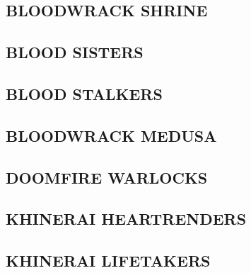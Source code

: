 \hypertarget{bloodwrack-shrine}{%
\subsection{BLOODWRACK SHRINE}\label{bloodwrack-shrine}}

\hypertarget{blood-sisters}{%
\subsection{BLOOD SISTERS}\label{blood-sisters}}

\hypertarget{blood-stalkers}{%
\subsection{BLOOD STALKERS}\label{blood-stalkers}}

\hypertarget{bloodwrack-medusa}{%
\subsection{BLOODWRACK MEDUSA}\label{bloodwrack-medusa}}

\hypertarget{doomfire-warlocks}{%
\subsection{DOOMFIRE WARLOCKS}\label{doomfire-warlocks}}

\hypertarget{khinerai-heartrenders}{%
\subsection{KHINERAI HEARTRENDERS}\label{khinerai-heartrenders}}

\hypertarget{khinerai-lifetakers}{%
\subsection{KHINERAI LIFETAKERS}\label{khinerai-lifetakers}}
